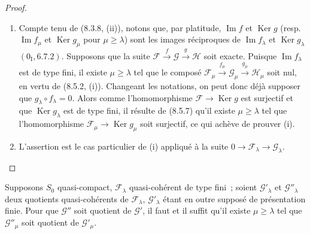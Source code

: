 \begin{proof}
\begin{enumerate}[label=(\roman*)]
  \item Compte tenu de (8.3.8, (ii)), notons que, par platitude,
  $\operatorname{Im}f$ et $\operatorname{Ker}g$ (resp.
  $\operatorname{Im}f_\mu$ et $\operatorname{Ker}g_\mu$ pour
  $\mu\geq\lambda$) sont les images réciproques de
  $\operatorname{Im}f_\lambda$ et $\operatorname{Ker}g_\lambda$
  $(0_{\mathrm I},6.7.2)$. Supposons que la suite
  $\mathcal F\xrightarrow{f}\mathcal G\xrightarrow{g}\mathcal H$ soit exacte.
  Puisque $\operatorname{Im}f_\lambda$ est de type fini, il existe
  $\mu\geq\lambda$ tel que le composé
  $\mathcal F_\mu\xrightarrow{f_\mu}\mathcal G_\mu
  \xrightarrow{g_\mu}\mathcal H_\mu$ soit nul, en vertu de (8.5.2, (i)).
  Changeant les notations, on peut donc déjà supposer que
  $g_\lambda\circ f_\lambda=0$. Alors comme l'homomorphisme
  $\mathcal F\to\operatorname{Ker}g$ est surjectif et que
  $\operatorname{Ker}g_\lambda$ est de type fini, il résulte de (8.5.7) qu'il
  existe $\mu\geq\lambda$ tel que l'homomorphisme
  $\mathcal F_\mu\to\operatorname{Ker}g_\mu$ soit surjectif, ce qui achève de
  prouver (i).

  \item L'assertion est le cas particulier de (i) appliqué à la suite
  $0\to\mathcal F_\lambda\to\mathcal G_\lambda$.
\end{enumerate}
\end{proof}

\begin{lemma}[8.5.9]
\label{IV.8.5.9-fr}
Supposons $S_0$ quasi-compact, $\mathcal F_\lambda$ quasi-cohérent de type
fini~; soient $\mathcal G'_\lambda$ et $\mathcal G''_\lambda$ deux quotients
quasi-cohérents de $\mathcal F_\lambda$, $\mathcal G'_\lambda$ étant en outre
supposé de présentation finie. Pour que $\mathcal G''$ soit quotient de
$\mathcal G'$, il faut et il suffit qu'il existe $\mu\geq\lambda$ tel que
$\mathcal G''_\mu$ soit quotient de $\mathcal G'_\mu$.
\end{lemma}

